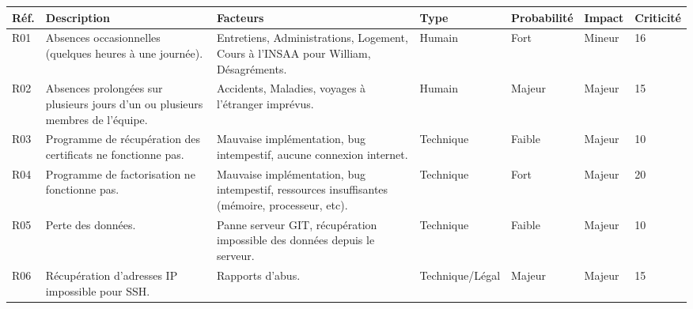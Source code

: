 \documentclass[a4paper,11pt,french]{article}
\begin{document}
\begin{center}
\begin{tabular}{|l|p{4cm}|p{4cm}|l|l|l|l|}
\hline
\textbf{Réf.} & \textbf{Description} & \textbf{Facteurs} & \textbf{Type} & \textbf{Probabilité} & \textbf{Impact} & \textbf{Criticité} \\
\hline
 \hline
 R01 & Absences occasionnelles (quelques heures à une journée). &
 Entretiens, Administrations, Logement, Cours à l'INSAA pour William, Désagréments. &
 Humain &
 Fort &
 Mineur &
 16 \\
 \hline
 R02 & Absences prolongées sur plusieurs jours d'un ou plusieurs membres de l'équipe. &
 Accidents, Maladies, voyages à l'étranger imprévus. &
 Humain &
 Majeur &
 Majeur &
 15 \\
 \hline
 R03 & Programme de récupération des certificats ne fonctionne pas. &
 Mauvaise implémentation, bug intempestif, aucune connexion internet. &
 Technique &
 Faible &
 Majeur &
 10 \\
\hline
 R04 & Programme de factorisation ne fonctionne pas. &
 Mauvaise implémentation, bug intempestif, ressources insuffisantes (mémoire, processeur, etc). &
 Technique &
 Fort &
 Majeur &
 20 \\
\hline
 R05 & Perte des données. &
 Panne serveur GIT, récupération impossible des données depuis le serveur. &
 Technique &
 Faible &
 Majeur &
 10 \\
\hline
 R06 & Récupération d'adresses IP impossible pour SSH. &
 Rapports d'abus. &
 Technique/Légal &
 Majeur &
 Majeur &
 15 \\
\hline

\end{tabular}
\end{center}
\end{document}
